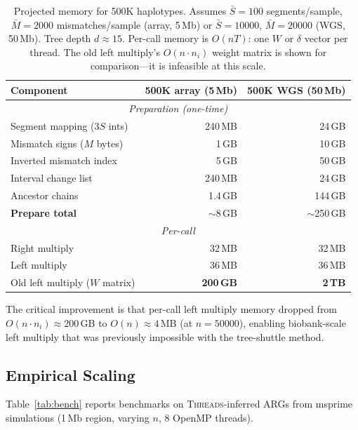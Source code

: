 \documentclass[11pt]{article}
\begin{document}
\begin{table}[h]
\centering
\begin{tabular}{l r r}
\toprule
Component & 500K array (5\,Mb) & 500K WGS (50\,Mb) \\
\midrule
\multicolumn{3}{c}{\emph{Preparation (one-time)}} \\
Segment mapping ($3S$ ints)  & 240\,MB & 24\,GB \\
Mismatch signs ($M$ bytes)   & 1\,GB   & 10\,GB \\
Inverted mismatch index      & 5\,GB   & 50\,GB \\
Interval change list         & 240\,MB & 24\,GB \\
Ancestor chains              & 1.4\,GB & 144\,GB \\
\midrule
\textbf{Prepare total}       & $\sim$8\,GB & $\sim$250\,GB \\
\midrule
\multicolumn{3}{c}{\emph{Per-call}} \\
Right multiply               & 32\,MB  & 32\,MB \\
Left multiply                & 36\,MB  & 36\,MB \\
Old left multiply ($W$ matrix) & \textbf{200\,GB} & \textbf{2\,TB} \\
\bottomrule
\end{tabular}
\caption{Projected memory for 500K haplotypes.  Assumes $\bar{S} = 100$
segments/sample, $\bar{M} = 2000$ mismatches/sample (array, 5\,Mb) or
$\bar{S} = 10000$, $\bar{M} = 20000$ (WGS, 50\,Mb).  Tree depth $d
\approx 15$.  Per-call memory is $O(nT)$: one $W$ or $\delta$ vector per
thread.  The old left multiply's $O(n \cdot n_i)$ weight matrix is shown
for comparison---it is infeasible at this scale.}
\label{tab:memory}
\end{table}

The critical improvement is that per-call left multiply memory dropped from
$O(n \cdot n_i) \approx 200$\,GB to $O(n) \approx 4$\,MB (at $n =
50000$), enabling biobank-scale left multiply that was previously
impossible with the tree-shuttle method.

\subsection{Empirical Scaling}

Table~\ref{tab:bench} reports benchmarks on \textsc{Threads}-inferred ARGs
from msprime simulations (1\,Mb region, varying $n$, 8 OpenMP threads).
\end{document}

